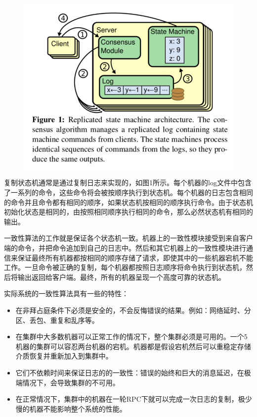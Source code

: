\documentclass[journal]{IEEEtran}
\begin{document}
\begin{figure}[htbp]
\begin{center}
\includegraphics[width=1\linewidth]{./fig1.png}
\end{center}
\end{figure}


复制状态机通常是通过复制日志来实现的，如图1所示。每个机器的log文件中包含了一系列的命令，这些命令将会被按顺序执行到状态机。每个机器的日志包含相同的命令并且命令都有相同的顺序，如果状态机按相同的顺序执行命令。由于状态机初始化状态是相同的，由按照相同顺序执行相同的命令，那么必然状态机有相同的输出。


一致性算法的工作就是保证各个状态机一致。机器上的一致性模块接受到来自客户端的命令，并把命令追加到自己的日志中。然后和其它机器上的一致性模块进行通信来保证最终所有机器都按相同的顺序存储了请求，即使其中的一些机器宕机不能工作。一旦命令被正确的复制，每个机器都按照日志顺序将命令执行到状态机，然后将输出返回给客户端。最终，所有的机器呈现一个高度可靠的状态机。

实际系统的一致性算法具有一些的特性：
\begin{itemize}
\item 在非拜占庭条件下必须是安全的，不会反悔错误的结果。例如：网络延时、分区、丢包、重复和乱序等。
\item 在集群中大多数机器可以正常工作的情况下，整个集群必须是可用的。一个5机器的集群可以容忍两台机器的宕机。机器都是假设宕机然后可以重稳定存储介质恢复并重新加入到集群中。
\item 它们不依赖时间来保证日志的的一致性：错误的始终和巨大的消息延迟，在极端情况下，会导致集群的不可用。
\item 在正常情况下，集群中的机器在一轮RPC下就可以完成一次日志的复制，极少慢的机器不能影响整个系统的性能。
\end{itemize}
\end{document}
